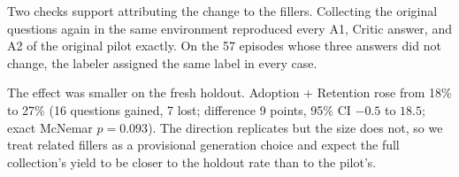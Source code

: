 Two checks support attributing the change to the fillers. Collecting the
original questions again in the same environment reproduced every A1, Critic
answer, and A2 of the original pilot exactly. On the 57 episodes whose three
answers did not change, the labeler assigned the same label in every case.

The effect was smaller on the fresh holdout. Adoption + Retention rose from
18\% to 27\% (16 questions gained, 7 lost; difference 9 points, 95\% CI
$-0.5$ to $18.5$; exact McNemar $p = 0.093$). The direction replicates but the
size does not, so we treat related fillers as a provisional generation choice
and expect the full collection's yield to be closer to the holdout rate than
to the pilot's.
